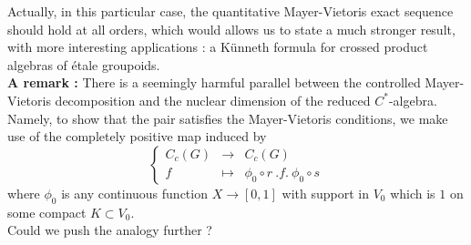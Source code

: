 Actually, in this particular case, the quantitative Mayer-Vietoris exact sequence should hold at all orders, which would allows us to state a much stronger result, with more interesting applications : a Künneth formula for crossed product algebras of étale groupoids.\\

\textbf{A remark :} There is a seemingly harmful parallel between the controlled Mayer-Vietoris decomposition and the nuclear dimension of the reduced $C^*$-algebra. Namely, to show that the pair satisfies the Mayer-Vietoris conditions, we make use of the completely positive map induced by 
\[\left\{\begin{array}{lcr} C_c(G) &\rightarrow & C_c(G) \\ f &\mapsto & \phi_0\circ r\ . f .\ \phi_0\circ s\end{array}\right.\]   
where $\phi_0$ is any continuous function $X\rightarrow [0,1]$ with support in $V_0$ which is $1$ on some compact $K\subset V_0$.\\
Could we push the analogy further ? 






































 



